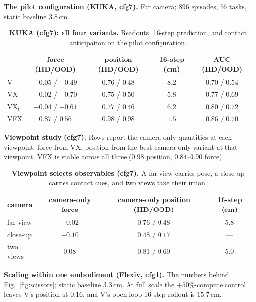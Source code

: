 \documentclass{article} %
\begin{document}
\textbf{The pilot configuration (KUKA, cfg7).} Far camera;
$896$ episodes, $56$ tasks, static baseline $3.8$\,cm.

\begin{table}[H]
\caption{\textbf{KUKA (cfg7): all four variants.} Readouts, 16-step prediction, and contact anticipation on the pilot configuration.}
\label{tab:kuka}
\begin{center}
\small
\begin{tabular}{lcccc}
\toprule
\rowcolor{tabhead} & force (IID/OOD) & position (IID/OOD) & 16-step (cm) & AUC (IID/OOD) \\
\midrule
V & $-0.05$ / $-0.49$ & $0.76$ / $0.48$ & $8.2$ & $0.70$ / $0.54$ \\
VX & $-0.02$ / $-0.70$ & $0.75$ / $0.50$ & $5.8$ & $0.77$ / $0.69$ \\
VX$_t$ & $-0.04$ / $-0.61$ & $0.77$ / $0.46$ & $6.2$ & $0.80$ / $0.72$ \\
\rowcolor{tabours} VFX & $0.87$ / $0.56$ & $0.98$ / $0.98$ & $1.5$ & $0.86$ / $0.70$ \\
\bottomrule
\end{tabular}
\end{center}
\end{table}

\textbf{Viewpoint study (cfg7).} Rows report the camera-only quantities at
each viewpoint: force from VX, position from the best camera-only variant
at that viewpoint. VFX is stable across all three ($0.98$ position,
$0.84$--$0.90$ force).

\begin{table}[H]
\caption{\textbf{Viewpoint selects observables (cfg7).} A far view carries pose, a close-up carries contact cues, and two views take their union.}
\label{tab:viewpoint}
\begin{center}
\small
\begin{tabular}{lccc}
\toprule
\rowcolor{tabhead} camera & camera-only force & camera-only position (IID/OOD) & 16-step (cm) \\
\midrule
far view & $-0.02$ & $0.76$ / $0.48$ & $5.8$ \\
close-up & $+0.10$ & $0.48$ / $0.17$ & --- \\
two views & $0.08$ & $0.81$ / $0.60$ & $5.0$ \\
\bottomrule
\end{tabular}
\end{center}
\end{table}

\textbf{Scaling within one embodiment (Flexiv, cfg1).} The numbers
behind Fig.~\ref{fig:scissors}; static baseline $3.3$\,cm. At full scale the
$+50\%$-compute control leaves V's position at $0.16$, and V's open-loop
16-step rollout is $15.7$\,cm.
\end{document}
